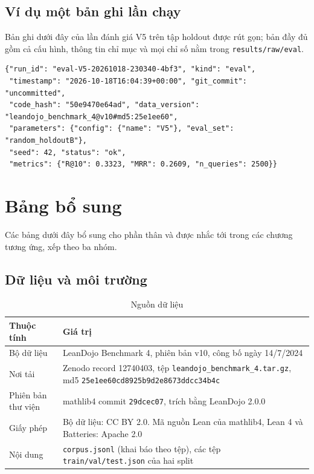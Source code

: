 \documentclass[11pt,a4paper,oneside]{report}
\newcommand{\code}[1]{\texttt{#1}}
\begin{document}
\section{Ví dụ một bản ghi lần chạy}\label{app:record}

Bản ghi dưới đây của lần đánh giá V5 trên tập holdout được rút gọn; bản đầy đủ gồm cả cấu hình, thông tin chỉ mục và mọi
chỉ số nằm trong \code{results/raw/eval}.

\noindent\begin{minipage}{\linewidth}
\begin{Verbatim}[fontsize=\footnotesize,frame=single,framesep=2mm]
{"run_id": "eval-V5-20261018-230340-4bf3", "kind": "eval",
 "timestamp": "2026-10-18T16:04:39+00:00", "git_commit": "uncommitted",
 "code_hash": "50e9470e64ad", "data_version": "leandojo_benchmark_4@v10#md5:25e1ee60",
 "parameters": {"config": {"name": "V5"}, "eval_set": "random_holdoutB"},
 "seed": 42, "status": "ok",
 "metrics": {"R@10": 0.3323, "MRR": 0.2609, "n_queries": 2500}}
\end{Verbatim}
\end{minipage}

\chapter{Bảng bổ sung}\label{app:tables}

Các bảng dưới đây bổ sung cho phần thân và được nhắc tới trong các chương tương ứng, xếp theo ba nhóm.

\section{Dữ liệu và môi trường}

\begin{table}[htbp]
\centering
\caption{Nguồn dữ liệu}\label{tab:source}
\begin{tabularx}{\linewidth}{@{}lX@{}}
\toprule
Thuộc tính & Giá trị \\
\midrule
Bộ dữ liệu & LeanDojo Benchmark 4, phiên bản v10, công bố ngày 14/7/2024 \\
Nơi tải & Zenodo record 12740403, tệp \code{leandojo\_benchmark\_4.tar.gz}, md5 \code{25e1ee60cd8925b9d2e8673ddcc34b4c} \\
Phiên bản thư viện & mathlib4 commit \code{29dcec07}, trích bằng LeanDojo 2.0.0~\cite{mathlib4repo} \\
Giấy phép & Bộ dữ liệu: CC BY 2.0. Mã nguồn Lean của mathlib4, Lean 4 và Batteries: Apache 2.0 \\
Nội dung & \code{corpus.jsonl} (khai báo theo tệp), các tệp \code{train/val/test.json} của hai split \\
\bottomrule
\end{tabularx}
\end{table}
\end{document}
